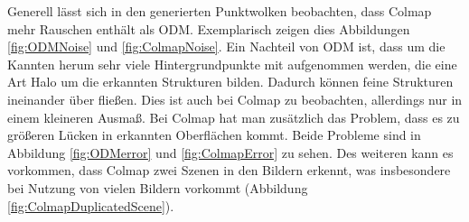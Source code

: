 \documentclass[12pt,titlepage, twoside]{article}
\begin{document}
Generell lässt sich in den generierten Punktwolken beobachten, dass Colmap mehr Rauschen enthält als ODM. Exemplarisch zeigen dies Abbildungen \ref{fig:ODMNoise} und \ref{fig:ColmapNoise}. 
Ein Nachteil von ODM ist, dass um die Kannten herum sehr viele Hintergrundpunkte mit aufgenommen werden, die eine Art Halo um die erkannten Strukturen bilden. 
Dadurch können feine Strukturen ineinander über fließen. Dies ist auch bei Colmap zu beobachten, allerdings nur in einem kleineren Ausmaß.
Bei Colmap hat man zusätzlich das Problem, dass es zu größeren Lücken in erkannten Oberflächen kommt.
Beide Probleme sind in Abbildung \ref{fig:ODMerror} und \ref{fig:ColmapError} zu sehen. 
Des weiteren kann es vorkommen, dass Colmap zwei Szenen in den Bildern erkennt, was insbesondere bei Nutzung von vielen Bildern vorkommt (Abbildung \ref{fig:ColmapDuplicatedScene}).
\end{document}
